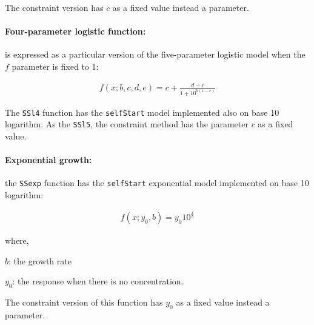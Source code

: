 \documentclass[11pt]{article}\usepackage[]{graphicx}\usepackage[]{color}
\newenvironment{itemize*}%
    {\begin{itemize}%
        \setlength{\itemsep}{-0.35cm}%
        \setlength{\parskip}{10pt}}%
{\end{itemize}}
\begin{document}
\noindent The constraint version has $c$ as a fixed value instead a 
parameter. 

\paragraph{Four-parameter logistic function:} is expressed as a particular version 
of the five-parameter logistic model when the $f$ parameter is fixed to 1:

\begin{align*}
f(x; b, c, d, e) = c +\frac{d-c}{1+10^{b(x-e)}}
\end{align*}

\noindent  The {\tt SSl4} function has the {\tt selfStart} model implemented 
also on base 10 logarithm. As the {\tt SSl5}, the constraint method has the 
parameter $c$ as a fixed value.

\paragraph{Exponential growth:} the {\tt SSexp} function has the 
{\tt selfStart} exponential model implemented on base 10 logarithm:

\begin{align*} 
f(x; y_0, b) = y_0 10^{\frac{x}{b}}
\end{align*}

where,

\begin{itemize*}
    \item $b$: the growth rate
    \item $y_0$: the response when there is no concentration.
\end{itemize*}


\noindent The constraint version of this function has $y_0$ as a fixed value 
instead a parameter. 
\end{document}
